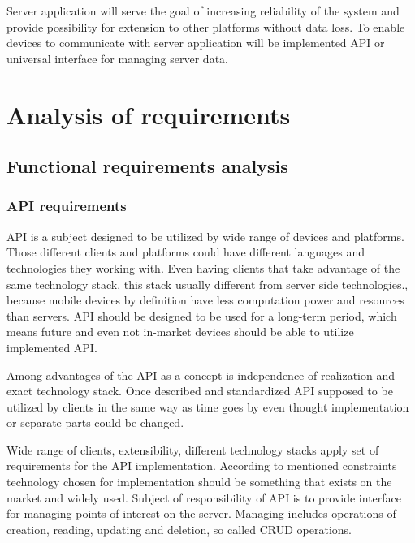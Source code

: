 \documentclass[thesis=M,english]{FITthesis}[2012/10/20]
\begin{document}
Server application will serve the goal of increasing reliability of the system and provide possibility for extension to other platforms without data loss. To enable devices to communicate with server application  will be implemented API or universal interface for managing server data.





\chapter{Analysis of requirements}

\section{Functional requirements analysis}

\subsection{API requirements}

API is a subject designed to be utilized by wide range of devices and platforms. Those different clients and platforms could have different languages and technologies they working with. Even having clients that take advantage of the same technology stack, this stack usually different from server side technologies., because mobile devices by definition have less computation power and resources than servers. API should be designed to be used for a long-term period, which means future and even not in-market devices should be able to utilize implemented API. 

Among advantages of the API as a concept is independence of realization and exact technology stack. Once described and standardized API supposed to be utilized by clients in the same way as time goes by even thought implementation or separate parts could be changed.

Wide range of clients, extensibility, different technology stacks apply set of requirements for the API implementation. According to mentioned constraints technology chosen for implementation should be something that exists on the market and widely used. 
Subject of responsibility of API is to provide interface for managing points of interest on the server. Managing includes operations of creation, reading, updating and deletion, so called CRUD operations.
\end{document}
